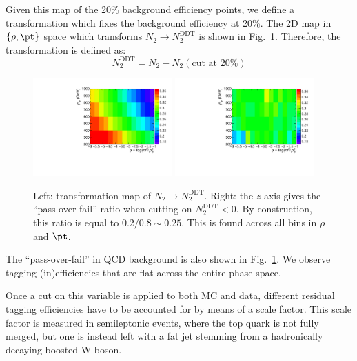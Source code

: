Given this map of the 20\% background efficiency points, we define a transformation which fixes the background efficiency at 20\%.
The 2D map in $\{\rho,\pt\}$ space which transforms $N_2 \rightarrow N_2^\text{DDT}$ is shown in Fig.~\ref{fig:transmap_20percent}.
Therefore, the transformation is defined as:
\begin{equation}
N_2^\text{DDT} = N_2 - N_2(\text{cut at 20\%})
\end{equation}

\begin{figure}
  \centering
  \includegraphics[width=0.475\textwidth]{figures/higgstagging/n2ddt/h2ddt.pdf}
  \includegraphics[width=0.475\textwidth]{figures/higgstagging/n2ddt/h2_rhoVpt_pafa.pdf}\\
  \caption{Left: transformation map of $N_2\rightarrow N_2^{\text{DDT}}$. Right: the $z$-axis gives the ``pass-over-fail'' ratio when cutting on $N_2^\text{DDT}<0$. By construction, this ratio is equal to $0.2/0.8\sim0.25$. This is found across all bins in $\rho$ and $\pt$.}
  \label{fig:transmap_20percent}
\end{figure}

The ``pass-over-fail'' in QCD background is also shown in Fig.~\ref{fig:transmap_20percent}. We observe tagging (in)efficiencies that are flat across the entire phase space. 


Once a cut on this variable is applied to both MC and data, different residual tagging efficiencies have to be accounted for by means of a scale factor. This scale factor is measured in semileptonic \ttbar events, where the top quark is not fully merged, but one is instead left with a fat jet stemming from a hadronically decaying boosted W boson.



